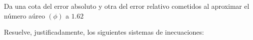 \documentclass[addpoints,spanish, 12pt,a4paper]{exam}
\renewcommand*\half{.5}
\begin{document}
\begin{questions}


\question[1] Da una cota del error absoluto y otra del error relativo cometidos al aproximar el número aúreo $\left(\phi\right)$ a $1.62$

        \question[3] Resuelve, justificadamente, los siguientes sistemas de inecuaciones:
        \begin{multicols}{2}
        \begin{parts} 

\end{parts}
\end{multicols}
\end{questions}
\end{document}
